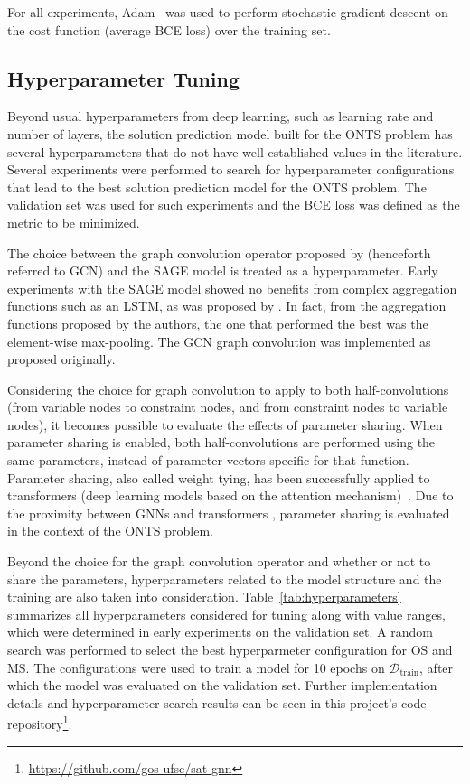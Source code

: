 For all experiments, Adam~\cite{kingmaAdamMethodStochastic2015} was used to perform stochastic gradient descent on the cost function (average BCE loss) over the training set.

\subsection{Hyperparameter Tuning}

Beyond usual hyperparameters from deep learning, such as learning rate and number of layers, the solution prediction model built for the ONTS problem has several hyperparameters that do not have well-established values in the literature.
Several experiments were performed to search for hyperparameter configurations that lead to the best solution prediction model for the ONTS problem.
The validation set was used for such experiments and the BCE loss was defined as the metric to be minimized.

The choice between the graph convolution operator proposed by  (henceforth referred to GCN) and the SAGE model is treated as a hyperparameter.
Early experiments with the SAGE model showed no benefits from complex aggregation functions such as an LSTM, as was proposed by .
In fact, from the aggregation functions proposed by the authors, the one that performed the best was the element-wise max-pooling.
The GCN graph convolution was implemented as proposed originally.

Considering the choice for graph convolution to apply to both half-convolutions (from variable nodes to constraint nodes, and from constraint nodes to variable nodes), it becomes possible to evaluate the effects of parameter sharing.
When parameter sharing is enabled, both half-convolutions are performed using the same parameters, instead of parameter vectors specific for that function.
Parameter sharing, also called weight tying, has been successfully applied to transformers (deep learning models based on the attention mechanism)~\cite{inan2017tying,press-wolf-2017-using}.
Due to the proximity between GNNs and transformers \cite{joshiTransformersAreGraph2020}, parameter sharing is evaluated in the context of the ONTS problem.

Beyond the choice for the graph convolution operator and whether or not to share the parameters, hyperparameters related to the model structure and the training are also taken into consideration.
Table~\ref{tab:hyperparameters} summarizes all hyperparameters considered for tuning along with value ranges, which were determined in early experiments on the validation set.
A random search was performed to select the best hyperparmeter configuration for OS and MS.
The configurations were used to train a model for 10 epochs on $\mathcal{D}_\textrm{train}$, after which the model was evaluated on the validation set.
Further implementation details and hyperparameter search results can be seen in this project's code repository\footnote{\url{https://github.com/gos-ufsc/sat-gnn}}.

